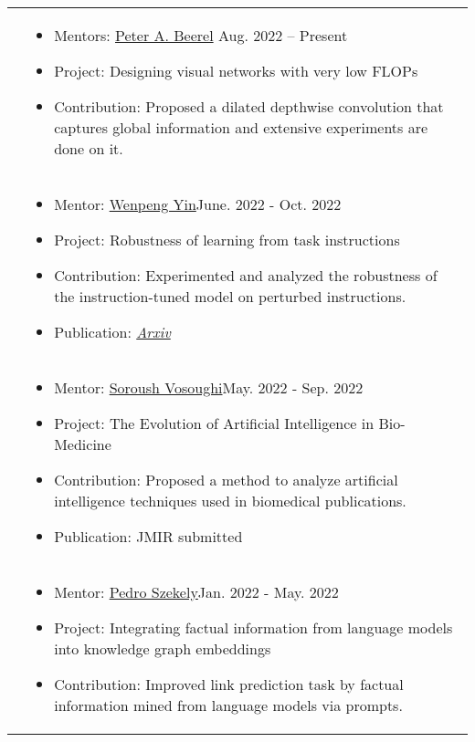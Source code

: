 \documentclass[letterpaper, 10pt]{article}
\begin{document}
\begin{longtable}{p{1.3in}p{4.8in}}
&  \begin{itemize}[leftmargin=10pt, itemsep=-5pt, topsep=0pt,before=\textbf{University of Southern California}]
    \item Mentors: \href{https://sites.usc.edu/eessc/people/}{Peter A. Beerel} \hfill Aug. 2022 -- Present 
    \item Project: Designing visual networks with very low FLOPs
    \item Contribution: Proposed a dilated depthwise convolution that captures global information and extensive experiments are done on it.
  \end{itemize}\\ 
  

&  \begin{itemize}[leftmargin=10pt, itemsep=-5pt, topsep=0pt,before=\textbf{Pennsylvania State University}]
    \item Mentor: \href{https://www.wenpengyin.org/}{Wenpeng Yin}\hfill June. 2022 - Oct. 2022
    \item Project: Robustness of learning from task instructions\hfill
    \item Contribution: Experimented and analyzed the robustness of the instruction-tuned model on perturbed instructions.
    \item Publication: \href{https://arxiv.org/abs/2212.03813}{\textit{Arxiv}}
  \end{itemize}\\ 

&  \begin{itemize}[leftmargin=10pt, itemsep=-5pt, topsep=0pt,before=\textbf{Dartmouth College}]
    \item Mentor: \href{https://www.cs.dartmouth.edu/~soroush//}{Soroush Vosoughi}\hfill May. 2022 - Sep. 2022
    \item Project: The Evolution of Artificial Intelligence in Bio-Medicine\hfill
    \item Contribution: Proposed a method to analyze artificial intelligence techniques used in biomedical publications.
    \item Publication: JMIR submitted
  \end{itemize}\\ 
  
&  \begin{itemize}[leftmargin=10pt, itemsep=-5pt, topsep=0pt,before=\textbf{University of Southern California}]
    \item Mentor: \href{https://usc-isi-i2.github.io/szekely/}{Pedro Szekely}\hfill Jan. 2022 - May. 2022
    \item Project: Integrating factual information from language models into knowledge graph embeddings \hfill 
    \item Contribution: Improved link prediction task by factual information mined from language models via prompts.
  \end{itemize}\\ 


\end{longtable}
\end{document}

